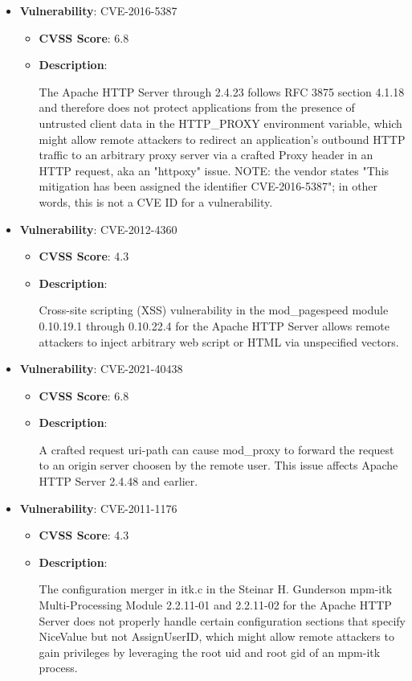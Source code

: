 \documentclass{article}
\begin{document}
\begin{itemize}
        \item \textbf{Vulnerability}: CVE-2016-5387
        \begin{itemize}
            \item \textbf{CVSS Score}:  6.8 
            \item \textbf{Description}:
            \parbox[t]{0.9\linewidth}{
                \ttfamily The Apache HTTP Server through 2.4.23 follows RFC 3875 section 4.1.18 and therefore does not protect applications from the presence of untrusted client data in the HTTP\_PROXY environment variable, which might allow remote attackers to redirect an application's outbound HTTP traffic to an arbitrary proxy server via a crafted Proxy header in an HTTP request, aka an "httpoxy" issue.  NOTE: the vendor states "This mitigation has been assigned the identifier CVE-2016-5387"; in other words, this is not a CVE ID for a vulnerability.
            }
        \end{itemize}
    
        \item \textbf{Vulnerability}: CVE-2012-4360
        \begin{itemize}
            \item \textbf{CVSS Score}:  4.3 
            \item \textbf{Description}:
            \parbox[t]{0.9\linewidth}{
                \ttfamily Cross-site scripting (XSS) vulnerability in the mod\_pagespeed module 0.10.19.1 through 0.10.22.4 for the Apache HTTP Server allows remote attackers to inject arbitrary web script or HTML via unspecified vectors.
            }
        \end{itemize}
    
        \item \textbf{Vulnerability}: CVE-2021-40438
        \begin{itemize}
            \item \textbf{CVSS Score}:  6.8 
            \item \textbf{Description}:
            \parbox[t]{0.9\linewidth}{
                \ttfamily A crafted request uri-path can cause mod\_proxy to forward the request to an origin server choosen by the remote user. This issue affects Apache HTTP Server 2.4.48 and earlier.
            }
        \end{itemize}
    
        \item \textbf{Vulnerability}: CVE-2011-1176
        \begin{itemize}
            \item \textbf{CVSS Score}:  4.3 
            \item \textbf{Description}:
            \parbox[t]{0.9\linewidth}{
                \ttfamily The configuration merger in itk.c in the Steinar H. Gunderson mpm-itk Multi-Processing Module 2.2.11-01 and 2.2.11-02 for the Apache HTTP Server does not properly handle certain configuration sections that specify NiceValue but not AssignUserID, which might allow remote attackers to gain privileges by leveraging the root uid and root gid of an mpm-itk process.
            }
        \end{itemize}
    

\end{itemize}
\end{document}
